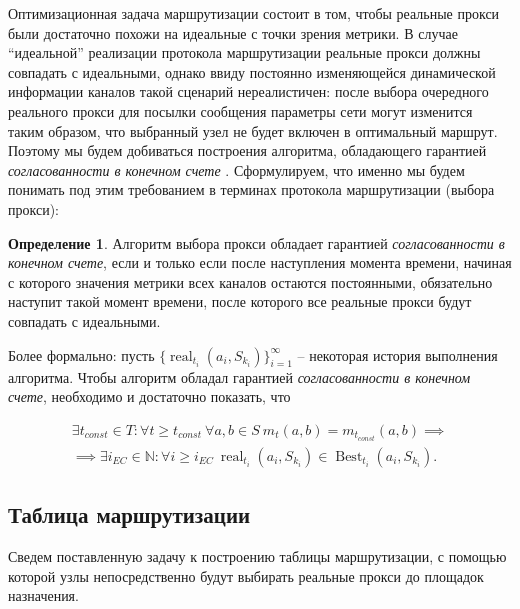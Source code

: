 \documentclass{article}
\theoremstyle{plain}
\theoremstyle{plain}
\theoremstyle{plain}
\theoremstyle{plain}
\theoremstyle{definition}
\newtheorem{definition}{Определение}[section]
\theoremstyle{remark}
\theoremstyle{plain}
\DeclareMathOperator*{\real}{real}
\DeclareMathOperator*{\best}{Best}
\begin{document}
Оптимизационная задача маршрутизации состоит в том, чтобы реальные прокси были достаточно похожи на идеальные с точки зрения метрики. В случае \enquote{идеальной} реализации протокола маршрутизации реальные прокси должны совпадать с идеальными, однако ввиду постоянно изменяющейся динамической информации каналов такой сценарий нереалистичен: после выбора очередного реального прокси для посылки сообщения параметры сети могут изменится таким образом, что выбранный узел не будет включен в оптимальный маршрут. Поэтому мы будем добиваться построения алгоритма, обладающего гарантией \textit{согласованности в конечном счете} \cite{eventual_consistency:10.1145/1435417.1435432}. Сформулируем, что именно мы будем понимать под этим требованием в терминах протокола маршрутизации (выбора прокси):

\begin{definition}
\label{EventualConsistencyDefinition}
    Алгоритм выбора прокси обладает гарантией \textit{согласованности в конечном счете}, если и только если после наступления момента времени, начиная с которого значения метрики всех каналов остаются постоянными, обязательно наступит такой момент времени, после которого все реальные прокси будут совпадать с идеальными.
\end{definition}

Более формально: пусть $\{\real_{t_i}(a_i, S_{k_i})\}_{i = 1}^{\infty}$ -- некоторая история выполнения алгоритма. Чтобы алгоритм обладал гарантией \textit{согласованности в конечном счете}, необходимо и достаточно показать, что 

\begin{equation}
\begin{aligned}
    \exists t_{const} \in T : \forall t \geq t_{const}\ \forall a, b \in S\ m_t(a, b) = m_{t_{const}}(a, b) \implies \\
    \implies \exists i_{EC} \in \mathbb{N} : \forall i \geq i_{EC}\ {\real}_{t_i}(a_i, S_{k_i}) \in {\best}_{t_i}(a_i, S_{k_i}).
\end{aligned}
\end{equation}

\subsection{Таблица маршрутизации}

Сведем поставленную задачу к построению таблицы маршрутизации, с помощью которой узлы непосредственно будут выбирать реальные прокси до площадок назначения.
\end{document}
